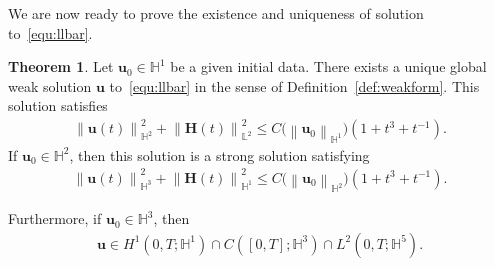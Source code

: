 \documentclass[11pt, reqno]{amsart}
\theoremstyle{definition}
\newtheorem{theorem}{Theorem}[section]
\numberwithin{equation}{section}
\newcommand{\bff}{\boldsymbol}
\newcommand{\bb}{\mathbb}
\newcommand{\norm}[2]{\left\|{#1}\right\|_{#2}}
\begin{document}
We are now ready to prove the existence and uniqueness of solution to~\eqref{equ:llbar}.

\begin{theorem}\label{the:sol}
Let $\bff{u}_0\in\bb{H}^1$ be a given initial data. There exists a unique global weak solution $\bff{u}$ to~\eqref{equ:llbar} in the sense of Definition~\ref{def:weakform}. This solution satisfies
\begin{align}\label{equ:u H H2}
    \norm{\bff{u}(t)}{\bb{H}^2}^2
    +
    \norm{\bff{H}(t)}{\bb{L}^2}^2
    \leq
    C\big( \norm{\bff{u}_0}{\bb{H}^1}\big) (1+t^3+t^{-1} ).
\end{align}
If $\bff{u}_0\in \bb{H}^2$, then this solution is a strong solution satisfying
\begin{align}\label{equ:u H H3}
    \norm{\bff{u}(t)}{\bb{H}^3}^2
    +
    \norm{\bff{H}(t)}{\bb{H}^1}^2
    \leq
    C\big( \norm{\bff{u}_0}{\bb{H}^2}\big) (1+t^3+t^{-1} ).
\end{align}

Furthermore, if $\bff{u}_0\in \bb{H}^3$, then
\begin{align}\label{equ:u0 H3}
\bff{u} \in H^1(0,T;\bb{H}^1)\cap C([0,T];\bb{H}^3) \cap L^2(0,T;\bb{H}^5).
\end{align}
\end{theorem}
\end{document}
